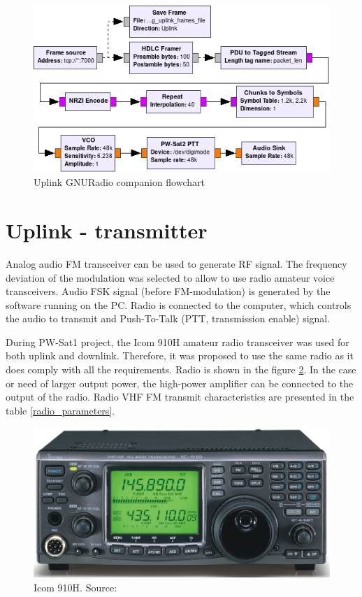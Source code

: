\begin{figure}
    \centering
    \includegraphics[width=0.8\paperwidth]{img/7/uplink_flowgraph.png}
    \caption{Uplink GNURadio companion flowchart}
    \label{uplink_flowgraph}
\end{figure}


\section{Uplink - transmitter}
Analog audio FM transceiver can be used to generate RF signal. The frequency deviation of the modulation was selected to allow to use radio amateur voice transceivers. Audio FSK signal (before FM-modulation) is generated by the software running on the PC. Radio is connected to the computer, which controls the audio to transmit and Push-To-Talk (PTT, transmission enable) signal.

During PW-Sat1 project, the Icom 910H amateur radio transceiver was used for both uplink and downlink. Therefore, it was proposed to use the same radio as it does comply with all the requirements. Radio is shown in the figure \ref{Icom_910H_ref}. In the case or need of larger output power, the high-power amplifier can be connected to the output of the radio. Radio VHF FM transmit characteristics are presented in the table \ref{radio_parameters}.

\begin{figure}[h]
    \centering
    \includegraphics[width=0.6\paperwidth]{img/7/icom910h.jpg}
    \caption{Icom 910H. Source: \cite{ICOM_910H_pic}}
    \label{Icom_910H_ref}
\end{figure}

